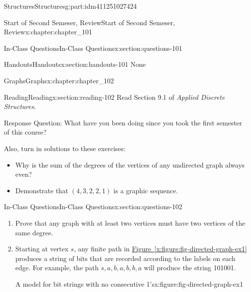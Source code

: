 \documentclass[oneside,10pt,]{book}
\newcommand{\xreffont}{\relax}
\numberwithin{equation}{section}
\begin{document}
\begin{partptx}{Structures}{}{Structures}{}{}{g:part:idm411251027424}
\begin{chapterptx}{Start of Second Semeser, Review}{}{Start of Second Semeser, Review}{}{}{x:chapter:chapter_101}
\begin{sectionptx}{In-Class Questions}{}{In-Class Questions}{}{}{x:section:questions-101}
%
\end{sectionptx}
%
%
\typeout{************************************************}
\typeout{************************************************}
%
\begin{sectionptx}{Handouts}{}{Handouts}{}{}{x:section:handouts-101}
None%
\end{sectionptx}
\end{chapterptx}
%
\typeout{************************************************}
\typeout{************************************************}
%
\begin{chapterptx}{Graphs}{}{Graphs}{}{}{x:chapter:chapter_102}
%
%
%
\typeout{************************************************}
\typeout{************************************************}
%
\begin{sectionptx}{Reading}{}{Reading}{}{}{x:section:reading-102}
Read Section 9.1 of \emph{Applied Discrete Structures}.%
\par
Response Question: What have you been doing since you took the first semester of this course?%
\par
Also, turn in solutions to these exercises:%
\begin{itemize}[label=\textbullet]
\item{}Why is the sum of the degrees of the vertices of any undirected graph always even?%
\item{}Demonstrate that \((4,3,2,2,1)\) is a graphic sequence.%
\end{itemize}
%
\end{sectionptx}
%
%
\typeout{************************************************}
\typeout{************************************************}
%
\begin{sectionptx}{In-Class Questions}{}{In-Class Questions}{}{}{x:section:questions-102}
%
\begin{enumerate}[label=\arabic*.]
\item{}Prove that any graph with at least two vertices must have two vertices of the same degree.%
\item{}Starting at vertex \(s\), any finite path in \hyperref[x:figure:fig-directed-graph-ex1]{Figure~{\xreffont\ref{x:figure:fig-directed-graph-ex1}}} produces a string of bits that are recorded according to the labels on each edge.  For example, the path \(s,a,b,a,b,b,a\) will produce the string 101001.%
\begin{figureptx}{A model for bit strings with no consecutive 1's}{x:figure:fig-directed-graph-ex1}{}%

\end{figureptx}
\end{enumerate}
\end{sectionptx}
\end{chapterptx}
\end{partptx}
\end{document}
